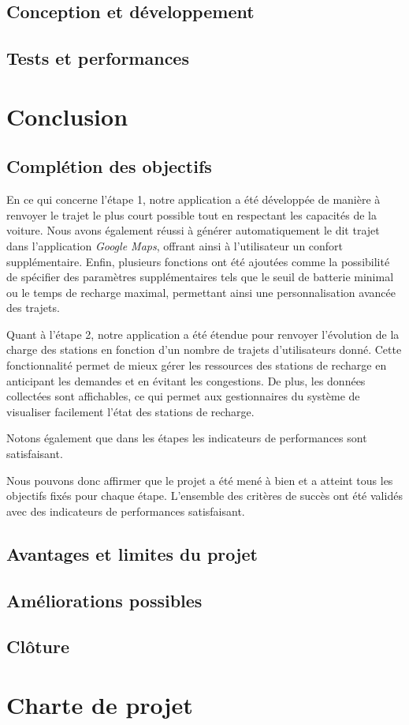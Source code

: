 \documentclass[a4paper, 12pt]{report}
\begin{document}
\clearpage

\section{Conception et développement}
\section{Tests et performances}

\chapter{Conclusion}
\minitoc
{}
\clearpage
\section{Complétion des objectifs}

En ce qui concerne l'étape 1, notre application a été développée de manière à renvoyer le trajet le plus court possible tout en respectant les capacités de la voiture. Nous avons également réussi à générer automatiquement le dit trajet dans l'application \textit{Google Maps}, offrant ainsi à l'utilisateur un confort supplémentaire. Enfin, plusieurs fonctions ont été ajoutées comme la possibilité de spécifier des paramètres supplémentaires tels que le seuil de batterie minimal ou le temps de recharge maximal, permettant ainsi une personnalisation avancée des trajets. 
\bigskip

Quant à l'étape 2, notre application a été étendue pour renvoyer l'évolution de la charge des stations en fonction d'un nombre de trajets d'utilisateurs donné. Cette fonctionnalité permet de mieux gérer les ressources des stations de recharge en anticipant les demandes et en évitant les congestions. De plus, les données collectées sont affichables, ce qui permet aux gestionnaires du système de visualiser facilement l'état des stations de recharge.
\bigskip

Notons également que dans les étapes les indicateurs de performances sont satisfaisant.
\bigskip

Nous pouvons donc affirmer que le projet a été mené à bien et a atteint tous les objectifs fixés pour chaque étape. L'ensemble des critères de succès ont été validés avec des indicateurs de performances satisfaisant.


\section{Avantages et limites du projet}
\section{Améliorations possibles}
\section{Clôture}

\appendix
\chapter{Charte de projet}
    \label{chap:AnnexeA}
    
\end{document}
